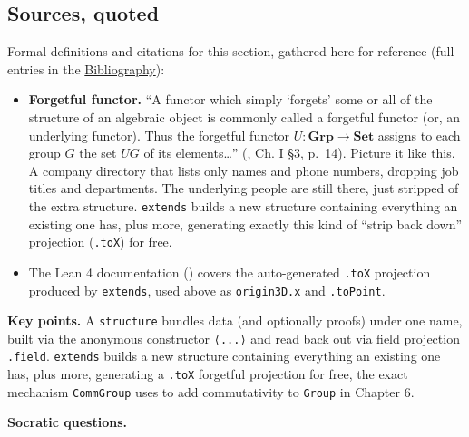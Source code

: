 \begin{center}

\end{center}

\subsection{Sources, quoted}\label{sec:02-functions-and-structures:03-extending-structures:3}

Formal definitions and citations for this section, gathered here for reference (full entries in the \hyperref[sec:root:bibliography:1]{Bibliography}):

\begin{itemize}
\tightlist
\item
  \textbf{Forgetful functor.} ``A functor which simply `forgets' some or all of the structure of an algebraic object is commonly called a forgetful functor (or, an underlying functor). Thus the forgetful functor \(U : \mathbf{Grp} \to \mathbf{Set}\) assigns to each group \(G\) the set \(UG\) of its elements\ldots{}'' (\cite{MacLane1998}, Ch. I §3, p.~14). Picture it like this. A company directory that lists only names and phone numbers, dropping job titles and departments. The underlying people are still there, just stripped of the extra structure. \texttt{extends} builds a new structure containing everything an existing one has, plus more, generating exactly this kind of ``strip back down'' projection (\texttt{.toX}) for free.
\item
  The Lean 4 documentation (\cite{LeanDocs}) covers the auto-generated \texttt{.toX} projection produced by \texttt{extends}, used above as \texttt{origin3D.x} and \texttt{.toPoint}.
\end{itemize}

\textbf{Key points.} A \texttt{structure} bundles data (and optionally proofs) under one name, built via the anonymous constructor \texttt{⟨...⟩} and read back out via field projection \texttt{.field}. \texttt{extends} builds a new structure containing everything an existing one has, plus more, generating a \texttt{.toX} forgetful projection for free, the exact mechanism \texttt{CommGroup} uses to add commutativity to \texttt{Group} in Chapter 6.

\textbf{Socratic questions.}

